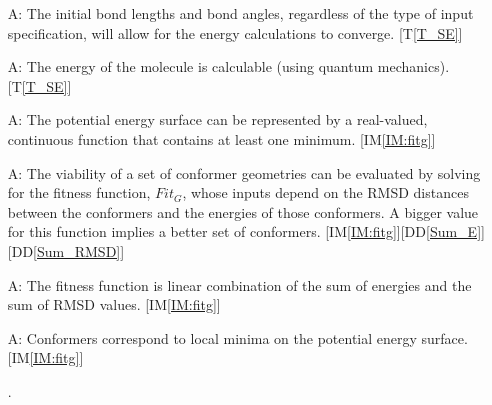 \documentclass[12pt]{article}
\newcommand{\ddref}[1]{DD\ref{#1}}
\newcommand{\tref}[1]{T\ref{#1}}
\newcounter{assumpnum} %
\newcommand{\iref}[1]{IM\ref{#1}}
\begin{document}

\begin{itemize}



\item[A\refstepcounter{assumpnum}\theassumpnum \label{A:init-params-conv}:] The 
initial bond lengths and bond angles, regardless of the type of input 
specification, will allow for the energy calculations to converge. [\tref{T_SE}]

\item[A\refstepcounter{assumpnum}\theassumpnum \label{A:E-calculable}:] The 
energy of the molecule is calculable (using quantum mechanics). [\tref{T_SE}]

\item[A\refstepcounter{assumpnum}\theassumpnum \label{A:one-min}:] The 
potential energy surface can be represented by a real-valued, continuous 
function that contains at least one minimum. [\iref{IM:fitg}]

\item[A\refstepcounter{assumpnum}\theassumpnum \label{A:emp-func}:] The 
viability of a set of conformer geometries can be evaluated by solving for the 
fitness function, $Fit_G$, whose inputs depend on the RMSD distances between 
the conformers and the energies of those conformers. A bigger value for this 
function implies a better set of conformers. 
[\iref{IM:fitg}][\ddref{Sum_E}][\ddref{Sum_RMSD}]

\item[A\refstepcounter{assumpnum}\theassumpnum \label{A:linear-fit}:] The 
fitness function is linear combination of the sum of energies and the sum of 
RMSD values. [\iref{IM:fitg}]

\item[A\refstepcounter{assumpnum}\theassumpnum \label{A:conf=min}:] Conformers 
correspond to local minima on the potential energy surface. [\iref{IM:fitg}]

.


\end{itemize}
\end{document}
